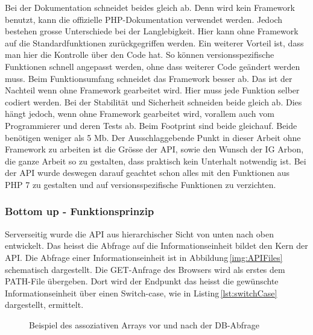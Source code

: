 Bei der Dokumentation schneidet beides gleich ab. Denn wird kein Framework benutzt, kann die offizielle PHP-Dokumentation verwendet werden. Jedoch bestehen grosse Unterschiede bei der Langlebigkeit. Hier kann ohne Framework auf die Standardfunktionen zurückgegriffen werden. Ein weiterer Vorteil ist, dass man hier die Kontrolle über den Code hat. So können versionsspezifische Funktionen schnell angepasst werden, ohne dass weiterer Code geändert werden muss. Beim Funktionsumfang schneidet das Framework besser ab. Das ist der Nachteil wenn ohne Framework gearbeitet wird. Hier muss jede Funktion selber codiert werden.
Bei der Stabilität und Sicherheit schneiden beide gleich ab. Dies hängt jedoch, wenn ohne Framework gearbeitet wird, vorallem auch vom Programmierer und deren Tests ab. Beim Footprint sind beide gleichauf. Beide benötigen weniger als 5 Mb. Der Ausschlaggebende Punkt in dieser Arbeit ohne Framework zu arbeiten ist die Grösse der API, sowie den Wunsch der IG Arbon, die ganze Arbeit so zu gestalten, dass praktisch kein Unterhalt notwendig ist. Bei der API wurde deswegen darauf geachtet schon alles mit den Funktionen aus PHP 7 zu gestalten und auf versionsspezifische Funktionen zu verzichten.



\subsubsection{Bottom up - Funktionsprinzip}
Serverseitig wurde die API aus hierarchischer Sicht von unten nach oben entwickelt. Das heisst die Abfrage auf die Informationseinheit bildet den Kern der API. Die Abfrage einer Informationseinheit ist in Abbildung\,\ref{img:APIFiles} schematisch dargestellt. Die GET-Anfrage des Browsers wird als erstes dem PATH-File übergeben. Dort wird der Endpunkt das heisst die gewünschte Informationseinheit über einen Switch-case, wie in Listing\,\ref{lst:switchCase} dargestellt, ermittelt.

\begin{figure}[htbp!]
	\centering
	\caption{Beispiel des assoziativen Arrays vor und nach der DB-Abfrage}
	\label{img:assozArray}
\end{figure}

